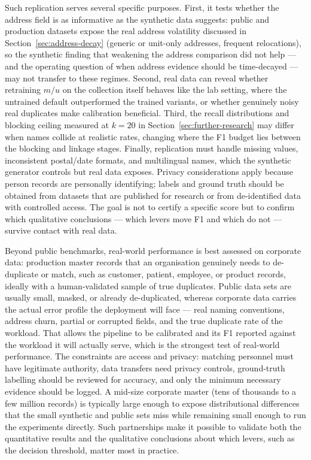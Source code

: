 \documentclass[11pt]{article}
\begin{document}
Such replication serves several specific purposes. First, it tests whether the address field is as informative as the synthetic data suggests: public and production datasets expose the real address volatility discussed in Section~\ref{sec:address-decay} (generic or unit-only addresses, frequent relocations), so the synthetic finding that weakening the address comparison did not help --- and the operating question of when address evidence should be time-decayed --- may not transfer to these regimes. Second, real data can reveal whether retraining $m/u$ on the collection itself behaves like the lab setting, where the untrained default outperformed the trained variants, or whether genuinely noisy real duplicates make calibration beneficial. Third, the recall distributions and blocking ceiling measured at $k=20$ in Section~\ref{sec:further-research} may differ when names collide at realistic rates, changing where the F1 budget lies between the blocking and linkage stages. Finally, replication must handle missing values, inconsistent postal/date formats, and multilingual names, which the synthetic generator controls but real data exposes. Privacy considerations apply because person records are personally identifying; labels and ground truth should be obtained from datasets that are published for research or from de-identified data with controlled access. The goal is not to certify a specific score but to confirm which qualitative conclusions --- which levers move F1 and which do not --- survive contact with real data.

Beyond public benchmarks, real-world performance is best assessed on corporate data: production master records that an organisation genuinely needs to de-duplicate or match, such as customer, patient, employee, or product records, ideally with a human-validated sample of true duplicates. Public data sets are usually small, masked, or already de-duplicated, whereas corporate data carries the actual error profile the deployment will face --- real naming conventions, address churn, partial or corrupted fields, and the true duplicate rate of the workload. That allows the pipeline to be calibrated and its F1 reported against the workload it will actually serve, which is the strongest test of real-world performance. The constraints are access and privacy: matching personnel must have legitimate authority, data transfers need privacy controls, ground-truth labelling should be reviewed for accuracy, and only the minimum necessary evidence should be logged. A mid-size corporate master (tens of thousands to a few million records) is typically large enough to expose distributional differences that the small synthetic and public sets miss while remaining small enough to run the experiments directly. Such partnerships make it possible to validate both the quantitative results and the qualitative conclusions about which levers, such as the decision threshold, matter most in practice.
\end{document}

